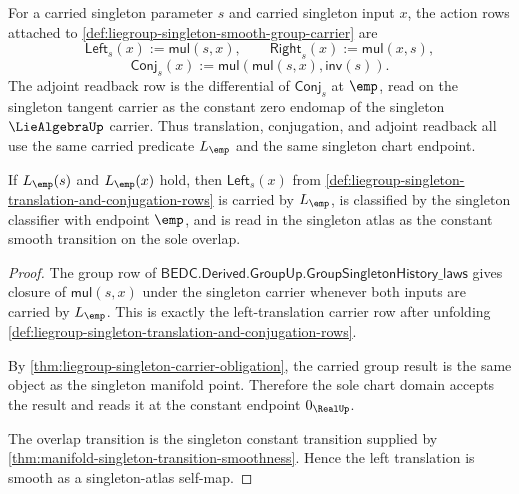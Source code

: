 \begin{definition}
\label{def:liegroup-singleton-translation-and-conjugation-rows}
For a carried singleton parameter $s$ and carried singleton input $x$, the
action rows attached to
\autoref{def:liegroup-singleton-smooth-group-carrier} are
$$
\mathsf{Left}_s(x):=\mathsf{mul}(s,x),\qquad
\mathsf{Right}_s(x):=\mathsf{mul}(x,s),
$$
$$
\mathsf{Conj}_s(x):=\mathsf{mul}(\mathsf{mul}(s,x),\mathsf{inv}(s)).
$$
The adjoint readback row is the differential of $\mathsf{Conj}_s$ at $\emp$,
read on the singleton tangent carrier as the constant zero endomap of the
singleton $\LieAlgebraUp$ carrier. Thus translation, conjugation, and adjoint
readback all use the same carried predicate $L_{\emp}$ and the same singleton
chart endpoint.
\end{definition}

\begin{theorem}
\label{thm:liegroup-singleton-left-translation-smooth}
If $L_{\emp}(s)$ and $L_{\emp}(x)$ hold, then
$\mathsf{Left}_s(x)$ from
\autoref{def:liegroup-singleton-translation-and-conjugation-rows} is carried by
$L_{\emp}$, is classified by the singleton classifier with endpoint $\emp$, and
is read in the singleton atlas as the constant smooth transition on the sole
overlap.
\end{theorem}
\begin{proof}
The group row of
$\mathsf{BEDC.Derived.GroupUp.GroupSingletonHistory\_laws}$ gives closure of
$\mathsf{mul}(s,x)$ under the singleton carrier whenever both inputs are carried
by $L_{\emp}$. This is exactly the left-translation carrier row after unfolding
\autoref{def:liegroup-singleton-translation-and-conjugation-rows}.

By \autoref{thm:liegroup-singleton-carrier-obligation}, the carried group result
is the same object as the singleton manifold point. Therefore the sole chart
domain accepts the result and reads it at the constant endpoint $0_{\RealUp}$.

The overlap transition is the singleton constant transition supplied by
\autoref{thm:manifold-singleton-transition-smoothness}. Hence the left
translation is smooth as a singleton-atlas self-map.
\end{proof}

